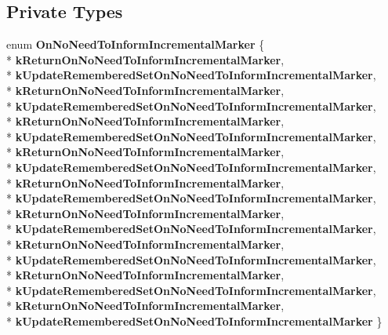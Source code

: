 \subsection*{Private Types}
\begin{DoxyCompactItemize}
\item 
enum {\bfseries On\+No\+Need\+To\+Inform\+Incremental\+Marker} \{ \\*
{\bfseries k\+Return\+On\+No\+Need\+To\+Inform\+Incremental\+Marker}, 
\\*
{\bfseries k\+Update\+Remembered\+Set\+On\+No\+Need\+To\+Inform\+Incremental\+Marker}, 
\\*
{\bfseries k\+Return\+On\+No\+Need\+To\+Inform\+Incremental\+Marker}, 
\\*
{\bfseries k\+Update\+Remembered\+Set\+On\+No\+Need\+To\+Inform\+Incremental\+Marker}, 
\\*
{\bfseries k\+Return\+On\+No\+Need\+To\+Inform\+Incremental\+Marker}, 
\\*
{\bfseries k\+Update\+Remembered\+Set\+On\+No\+Need\+To\+Inform\+Incremental\+Marker}, 
\\*
{\bfseries k\+Return\+On\+No\+Need\+To\+Inform\+Incremental\+Marker}, 
\\*
{\bfseries k\+Update\+Remembered\+Set\+On\+No\+Need\+To\+Inform\+Incremental\+Marker}, 
\\*
{\bfseries k\+Return\+On\+No\+Need\+To\+Inform\+Incremental\+Marker}, 
\\*
{\bfseries k\+Update\+Remembered\+Set\+On\+No\+Need\+To\+Inform\+Incremental\+Marker}, 
\\*
{\bfseries k\+Return\+On\+No\+Need\+To\+Inform\+Incremental\+Marker}, 
\\*
{\bfseries k\+Update\+Remembered\+Set\+On\+No\+Need\+To\+Inform\+Incremental\+Marker}, 
\\*
{\bfseries k\+Return\+On\+No\+Need\+To\+Inform\+Incremental\+Marker}, 
\\*
{\bfseries k\+Update\+Remembered\+Set\+On\+No\+Need\+To\+Inform\+Incremental\+Marker}, 
\\*
{\bfseries k\+Return\+On\+No\+Need\+To\+Inform\+Incremental\+Marker}, 
\\*
{\bfseries k\+Update\+Remembered\+Set\+On\+No\+Need\+To\+Inform\+Incremental\+Marker}, 
\\*
{\bfseries k\+Return\+On\+No\+Need\+To\+Inform\+Incremental\+Marker}, 
\\*
{\bfseries k\+Update\+Remembered\+Set\+On\+No\+Need\+To\+Inform\+Incremental\+Marker}
 \}\hypertarget{classv8_1_1internal_1_1_record_write_stub_a73c74b063dd8faec52398bc09bd68bce}{}\label{classv8_1_1internal_1_1_record_write_stub_a73c74b063dd8faec52398bc09bd68bce}


\end{DoxyCompactItemize}
